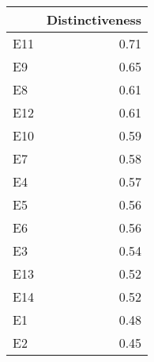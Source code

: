 \begin{table}

\caption{\label{tab:Cg}}
\centering
\begin{tabular}[t]{lr}
\toprule
  & Distinctiveness\\
\midrule
E11 & 0.71\\
E9 & 0.65\\
E8 & 0.61\\
E12 & 0.61\\
E10 & 0.59\\
E7 & 0.58\\
E4 & 0.57\\
E5 & 0.56\\
E6 & 0.56\\
E3 & 0.54\\
E13 & 0.52\\
E14 & 0.52\\
E1 & 0.48\\
E2 & 0.45\\
\bottomrule
\end{tabular}
\end{table}
